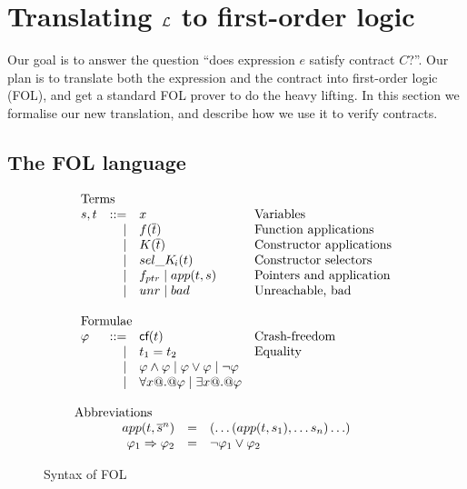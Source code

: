 \section{Translating $\cal L$ to first-order logic} \label{ssect:trans-fol}

Our goal is to answer the question ``does expression $e$ satisfy
contract $C$?''.  Our plan is to translate both the expression and the
contract into first-order logic (FOL), and get a standard FOL prover
to do the heavy lifting.
In this section we formalise our new translation, and describe how we use it to
verify contracts.

\subsection{The FOL language}

\begin{figure}
\[\begin{array}{c}
\begin{array}{lrll}
\multicolumn{3}{l}{\text{Terms}} \\
  s,t & ::=  & x                          & \text{Variables} \\
      & \mid & f(\ol{t})                  & \text{Function applications} \\
      & \mid & K(\ol{t})                  & \text{Constructor applications} \\
      & \mid & \sel{K}{i}(t)              & \text{Constructor selectors} \\
      & \mid & f_{ptr} \mid app(t,s)       & \text{Pointers and application} \\
      & \mid & \unr \mid \bad             & \text{Unreachable, bad} \\ \\
\multicolumn{3}{l}{\text{Formulae}} \\
 \phi & ::=  & \lcf{t}    & \text{Crash-freedom} \\
      & \mid & t_1 = t_2  & \text{Equality} \\
      & \mid & \phi \land \phi \mid \phi \lor \phi \mid \neg \phi \\
      & \mid & \forall x @.@ \phi \mid \exists x @.@ \phi \\ \\
\end{array}
\\
\multicolumn{1}{l}{\text{Abbreviations}} \\
\begin{array}{rcl}
app(t,\oln{s}{n}) & = & (\ldots(app(t,s_1),\ldots s_n)\ldots) \\
\phi_1 \Rightarrow \phi_2 & = & \neg \phi_1 \lor \phi_2
\end{array}
\end{array}\]
\caption{Syntax of FOL}\label{fig:fol-image}
\end{figure}

